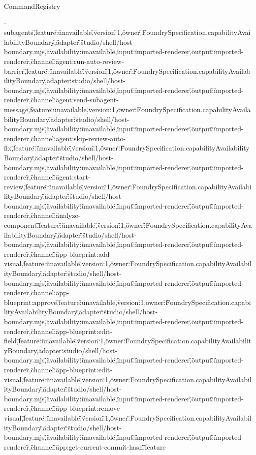 \begin{lexlean}{CommandRegistry}
\begin{semanticmodule}
{-subagents\",\"feature\":\"unavailable\",\"version\":1,\"owner\":\"FoundrySpecification.capabilityAvailabilityBoundary\",\"adapter\":\"studio/shell/host-boundary.mjs\",\"availability\":\"unavailable\",\"input\":\"imported-renderer\",\"output\":\"imported-renderer\"},{\"channel\":\"agent:run-auto-review-barrier\",\"feature\":\"unavailable\",\"version\":1,\"owner\":\"FoundrySpecification.capabilityAvailabilityBoundary\",\"adapter\":\"studio/shell/host-boundary.mjs\",\"availability\":\"unavailable\",\"input\":\"imported-renderer\",\"output\":\"imported-renderer\"},{\"channel\":\"agent:send-subagent-message\",\"feature\":\"unavailable\",\"version\":1,\"owner\":\"FoundrySpecification.capabilityAvailabilityBoundary\",\"adapter\":\"studio/shell/host-boundary.mjs\",\"availability\":\"unavailable\",\"input\":\"imported-renderer\",\"output\":\"imported-renderer\"},{\"channel\":\"agent:skip-review-auto-fix\",\"feature\":\"unavailable\",\"version\":1,\"owner\":\"FoundrySpecification.capabilityAvailabilityBoundary\",\"adapter\":\"studio/shell/host-boundary.mjs\",\"availability\":\"unavailable\",\"input\":\"imported-renderer\",\"output\":\"imported-renderer\"},{\"channel\":\"agent:start-review\",\"feature\":\"unavailable\",\"version\":1,\"owner\":\"FoundrySpecification.capabilityAvailabilityBoundary\",\"adapter\":\"studio/shell/host-boundary.mjs\",\"availability\":\"unavailable\",\"input\":\"imported-renderer\",\"output\":\"imported-renderer\"},{\"channel\":\"analyze-component\",\"feature\":\"unavailable\",\"version\":1,\"owner\":\"FoundrySpecification.capabilityAvailabilityBoundary\",\"adapter\":\"studio/shell/host-boundary.mjs\",\"availability\":\"unavailable\",\"input\":\"imported-renderer\",\"output\":\"imported-renderer\"},{\"channel\":\"app-blueprint:add-visual\",\"feature\":\"unavailable\",\"version\":1,\"owner\":\"FoundrySpecification.capabilityAvailabilityBoundary\",\"adapter\":\"studio/shell/host-boundary.mjs\",\"availability\":\"unavailable\",\"input\":\"imported-renderer\",\"output\":\"imported-renderer\"},{\"channel\":\"app-blueprint:approve\",\"feature\":\"unavailable\",\"version\":1,\"owner\":\"FoundrySpecification.capabilityAvailabilityBoundary\",\"adapter\":\"studio/shell/host-boundary.mjs\",\"availability\":\"unavailable\",\"input\":\"imported-renderer\",\"output\":\"imported-renderer\"},{\"channel\":\"app-blueprint:edit-field\",\"feature\":\"unavailable\",\"version\":1,\"owner\":\"FoundrySpecification.capabilityAvailabilityBoundary\",\"adapter\":\"studio/shell/host-boundary.mjs\",\"availability\":\"unavailable\",\"input\":\"imported-renderer\",\"output\":\"imported-renderer\"},{\"channel\":\"app-blueprint:edit-visual\",\"feature\":\"unavailable\",\"version\":1,\"owner\":\"FoundrySpecification.capabilityAvailabilityBoundary\",\"adapter\":\"studio/shell/host-boundary.mjs\",\"availability\":\"unavailable\",\"input\":\"imported-renderer\",\"output\":\"imported-renderer\"},{\"channel\":\"app-blueprint:remove-visual\",\"feature\":\"unavailable\",\"version\":1,\"owner\":\"FoundrySpecification.capabilityAvailabilityBoundary\",\"adapter\":\"studio/shell/host-boundary.mjs\",\"availability\":\"unavailable\",\"input\":\"imported-renderer\",\"output\":\"imported-renderer\"},{\"channel\":\"app:get-current-commit-hash\",\"feature}
\end{semanticmodule}
\end{lexlean}
